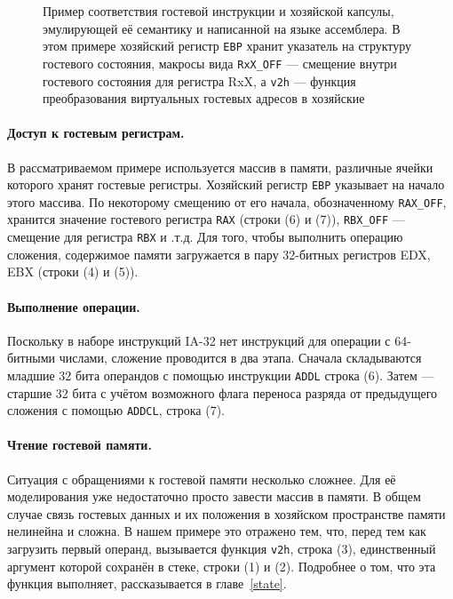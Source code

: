 \begin{figure}[htb]
    \centering
    \caption[Пример соответствия гостевой инструкции и хозяйской капсулы]{Пример соответствия гостевой инструкции и хозяйской капсулы, эмулирующей её семантику и написанной на языке ассемблера. В этом примере хозяйский регистр \texttt{EBP} хранит указатель на структуру гостевого состояния, макросы вида \texttt{RxX_OFF} --- смещение внутри гостевого состояния для регистра RxX, а \texttt{v2h} --- функция преобразования виртуальных гостевых адресов в хозяйские}
    \label{fig:capsule}
\end{figure}

\paragraph{Доступ к гостевым регистрам.}

В рассматриваемом примере используется массив в памяти, различные ячейки которого хранят гостевые регистры. Хозяйский регистр \texttt{EBP} указывает на начало этого массива. По некоторому смещению от его начала, обозначенному \texttt{RAX_OFF}, хранится значение гостевого регистра \texttt{RAX} (строки (6) и (7)), \texttt{RBX_OFF} --- смещение для регистра \texttt{RBX} и .т.д. Для того, чтобы выполнить операцию сложения, содержимое памяти загружается в пару 32-битных регистров EDX, EBX (строки (4) и (5)). 

\paragraph{Выполнение операции.}
Поскольку в наборе инструкций IA-32 нет инструкций для операции с 64-битными числами, сложение проводится в два этапа. Сначала складываются младшие 32 бита операндов с помощью инструкции \texttt{ADDL} строка (6). Затем --- старшие 32 бита с учётом возможного флага переноса разряда от предыдущего сложения с помощью \texttt{ADDCL}, строка (7).

\paragraph{Чтение гостевой памяти.}

Ситуация с обращениями к гостевой памяти несколько сложнее. Для её моделирования уже недостаточно просто завести массив в памяти. В общем случае связь гостевых данных и их положения в хозяйском пространстве памяти нелинейна и сложна. В нашем примере это отражено тем, что, перед тем как загрузить первый операнд, вызывается функция \texttt{v2h}, строка (3), единственный аргумент которой сохранён в стеке, строки (1) и (2). Подробнее о том, что эта функция выполняет, рассказывается в главе~\ref{state}.

